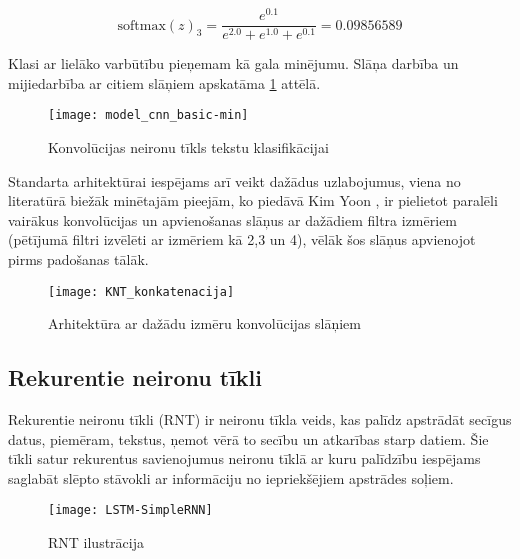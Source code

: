 \[ \text{softmax}(z)_3 = \frac{e^{0.1}}{e^{2.0} + e^{1.0} + e^{0.1}} = 0.09856589\]

Klasi ar lielāko varbūtību pieņemam kā gala minējumu. Slāņa darbība un mijiedarbība ar citiem slāņiem apskatāma \ref{fig:model_cnn_basic} attēlā.

\begin{figure}[H]
	\texttt{[image: model\_cnn\_basic-min]}
	\caption{Konvolūcijas neironu tīkls tekstu klasifikācijai \cite{TextCNNLena}}
	\label{fig:model_cnn_basic}
\end{figure}

Standarta arhitektūrai iespējams arī veikt dažādus uzlabojumus, viena no literatūrā biežāk minētajām pieejām, ko piedāvā Kim Yoon \cite{kimYoonCNN}, ir pielietot paralēli vairākus konvolūcijas un apvienošanas slāņus ar dažādiem filtra izmēriem (pētījumā filtri izvēlēti ar izmēriem kā 2,3 un 4), vēlāk šos slāņus apvienojot pirms padošanas tālāk.

\begin{figure}[H]
	\texttt{[image: KNT\_konkatenacija]}
	\caption{Arhitektūra ar dažādu izmēru konvolūcijas slāņiem \cite{TextCNNLena}}
	\label{fig:KNT_konkatenacija}
\end{figure}

\subsection{Rekurentie neironu tīkli}
Rekurentie neironu tīkli (RNT) ir neironu tīkla veids, kas palīdz apstrādāt secīgus datus, piemēram, tekstus, ņemot vērā to secību un atkarības starp datiem. Šie tīkli satur rekurentus savienojumus neironu tīklā ar kuru palīdzību iespējams saglabāt slēpto stāvokli ar informāciju no iepriekšējiem apstrādes soļiem.

\begin{figure}[H]
\texttt{[image: LSTM-SimpleRNN]}
\caption{RNT ilustrācija \cite{ChristopherOlahLSTM}}
\label{fig:LSTM-SimpleRNN}
\end{figure}

